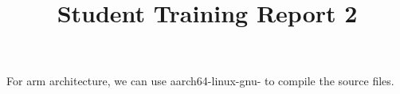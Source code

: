\documentclass[10pt,journal,compsoc]{IEEEtran}
\begin{document}
\title{Student Training Report 2}

\maketitle
\IEEEdisplaynontitleabstractindextext
\IEEEpeerreviewmaketitle

For arm architecture, we can use aarch64-linux-gnu- to compile the source files.
\end{document}
